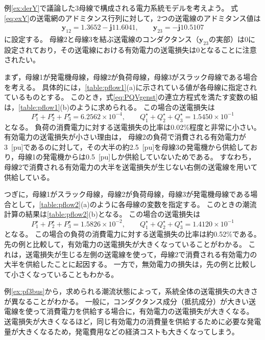 \documentclass[tombow,dvipdfmx]{corona-a5-1.1}
\begin{document}
\begin{例}[データシートに基づく潮流計算]\label{ex:pf3bus}
例\ref{ex:derY}で議論した3母線で構成される電力系統モデルを考えよう。
式\ref{eq:exY}の送電網のアドミタンス行列に対して，2つの送電線のアドミタンス値は
\begin{align}\label{eq:rightlossless}
\bm{y}_{12} = 1.3652 - \bm{j} 11.6041, \qquad
\bm{y}_{23} =  - \bm{j} 10.5107
\end{align}
に設定する。
母線2と母線3を結ぶ送電線のコンダクタンス（$\bm{y}_{23}$の実部）は0に設定されており，その送電線における有効電力の送電損失は0となることに注意されたい。

まず，母線1が発電機母線，母線2が負荷母線，母線3がスラック母線である場合を考える。
具体的には，\ref{table:pflow1}(a)に示されている値が各母線に指定されているものとする。
このとき，式\ref{eq:PQVgenst}の連立方程式を満たす変数の組は，\ref{table:pflow1}(b)のように求められる。
この場合の送電損失は
\[
P_1^{\star} + P_2^{\star} + P_3^{\star} = 6.2562\times 10^{-4},
\qquad 
Q_1^{\star} + Q_2^{\star} + Q_3^{\star} =1.5450  \times 10^{-1}
\]
となる。
負荷の消費電力に対する送電損失の比率は0.02\%程度と非常に小さい。
有効電力の送電損失が小さい理由は，
母線2の負荷で消費される有効電力が3~[pu]であるのに対して，その大半の約2.5~[pu]を母線3の発電機から供給しており，母線1の発電機からは0.5~[pu]しか供給していないためである。
すなわち，母線2で消費される有効電力の大半を送電損失が生じない右側の送電線を用いて供給している。

つぎに，母線1がスラック母線，母線2が負荷母線，母線3が発電機母線である場合として，\ref{table:pflow2}(a)のように各母線の変数を指定する。
このときの潮流計算の結果は\ref{table:pflow2}(b)となる。
この場合の送電損失は
\[
P_1^{\star} + P_2^{\star} + P_3^{\star} = 1.5826 \times 10^{-2},
\qquad 
Q_1^{\star} + Q_2^{\star} + Q_3^{\star} =1.4120  \times 10^{-1}
\]
となる。
この場合の負荷の消費電力に対する送電損失の比率は約0.52\%である。
先の例と比較して，有効電力の送電損失が大きくなっていることがわかる。
これは，送電損失が生じる左側の送電線を使って，母線2で消費される有効電力の大半を供給したことに起因する。
一方で，無効電力の損失は，先の例と比較して小さくなっていることもわかる。
\end{例}

例\ref{ex:pf3bus}から，求められる潮流状態によって，系統全体の送電損失の大きさが異なることがわかる。
一般に，コンダクタンス成分（抵抗成分）が大きい送電線を使って消費電力を供給する場合に，有効電力の送電損失が大きくなる。
送電損失が大きくなるほど，同じ有効電力の消費量を供給するために必要な発電量が大きくなるため，発電費用などの経済コストも大きくなってしまう。
\end{document}
